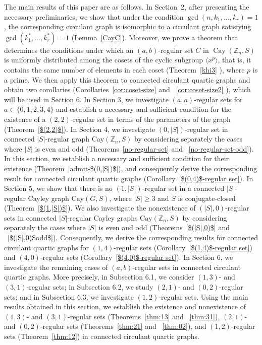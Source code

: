 \documentclass[12pt]{article}
\begin{document}
The main results of this paper are as follows. In Section~2, after presenting the necessary preliminaries, we show that under the condition $\gcd(n,k_1,\ldots,k_r)=1$, the corresponding circulant graph is isomorphic to a circulant graph satisfying $\gcd(k_1^*,\ldots,k_r^*)=1$ (Lemma~\ref{CayC}). Moreover, we prove a theorem that determines the conditions under which an $(a,b)$-regular set $C$ in $\operatorname{Cay}(\mathbb{Z}_n,S)$ is uniformly distributed among the cosets of the cyclic subgroup $\langle x^p\rangle$, that is, it contains the same number of elements in each coset (Theorem~\ref{khi3} ), where $p$ is a prime. We then apply this theorem to connected circulant quartic graphs and obtain two corollaries (Corollaries~\ref{cor:coset-size} and ~\ref{cor:coset-size2} ), which will be used in Section 6. In Section 3, we investigate $(a,a)$-regular sets for $a\in\{0,1,2,3,4\}$ and establish a necessary and sufficient condition for the existence of a $(2,2)$-regular set in terms of the parameters of the graph (Theorem~\ref{$(2,2)$}). In Section 4, we investigate $(0,|S|)$-regular set in connected $|S|$-regular graph $\mathrm{Cay}(\mathbb{Z}_n,S)$ by considering separately the cases where $|S|$ is even and odd (Theorems~\ref{no-regular-set} and ~\ref{no-regular-set-odd}). In this section, we establish a necessary and sufficient condition for their existence (Theorem~\ref{admit-$(0,|S|)$}), and consequently derive the corresponding result for connected circulant quartic graphs (Corollary~\ref{$(0,4)$-regular set}). In Section 5, we show that there is no $(1,|S|)$-regular set in a connected $|S|$-regular Cayley graph $\mathrm{Cay}(G,S)$, where $|S|\geq 3$ and $S$ is conjugate-closed (Theorem~\ref{$(1,|S|)$}). We also investigate the nonexistence of $(|S|,0)$-regular sets in connected $|S|$-regular Cayley graphs $\mathrm{Cay}(\mathbb{Z}_n,S)$ by considering separately the cases where $|S|$ is even and odd (Theorems~\ref{$(|S|,0)$} and ~\ref{$(|S|,0)Sodd$}). Consequently, we derive the corresponding results for connected circulant quartic graphs for $(1,4)$-regular sets (Corollary~\ref{$(1,4)$-regular set}) and $(4,0)$-regular sets (Corollary~\ref{$(4,0)$-regular set}). In Section 6, we investigate the remaining cases of $(a,b)$-regular sets in connected circulant quartic graphs. More precisely, in Subsection 6.1, we consider $(1,3)$- and $(3,1)$-regular sets; in Subsection 6.2, we study $(2,1)$- and $(0,2)$-regular sets; and in Subsection 6.3, we investigate $(1,2)$-regular sets. Using the main results obtained in this section, we establish the existence and nonexistence of $(1,3)$- and $(3,1)$-regular sets (Theorems~\ref{thm:13} and ~\ref{thm:31}), $(2,1)$- and $(0,2)$-regular sets (Theorems~\ref{thm:21} and ~\ref{thm:02}), and $(1,2)$-regular sets (Theorem~\ref{thm:12}) in connected circulant quartic graphs.
\end{document}
